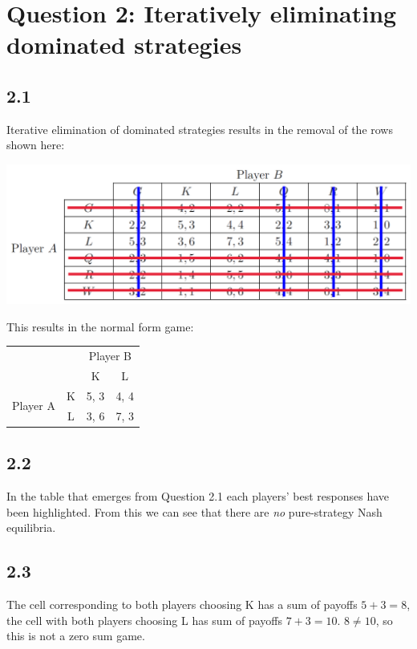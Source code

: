 \documentclass{article}
\begin{document}
\section*{Question 2: Iteratively eliminating dominated strategies}
\subsection*{2.1} Iterative elimination of dominated strategies results in the removal of the rows shown here:
\begin{center}
    \includegraphics[width=0.7\linewidth]{iterative-elimination.png}
\end{center}
This results in the normal form game:
\begin{table}[h!]
    \centering
    \begin{tabular}{cccc}
                                                   &                        & \multicolumn{2}{c}{Player B}                          \\ \cline{3-4} 
                                                   & \multicolumn{1}{c|}{}  & \multicolumn{1}{c|}{K}    & \multicolumn{1}{c|}{L}    \\ \cline{2-4} 
    \multicolumn{1}{c|}{\multirow{2}{*}{Player A}} & \multicolumn{1}{c|}{K} & \multicolumn{1}{c|}{{\color{red}5}, 3} & \multicolumn{1}{c|}{4, {\color{blue}4}} \\ \cline{2-4} 
    \multicolumn{1}{c|}{}                          & \multicolumn{1}{c|}{L} & \multicolumn{1}{c|}{3, {\color{blue}6}} & \multicolumn{1}{c|}{{\color{red}7}, 3} \\ \cline{2-4} 
    \end{tabular}
\end{table}

\subsection*{2.2}
In the table that emerges from Question 2.1 each players' best responses have been highlighted. From this we can see that there are \textit{no} pure-strategy Nash equilibria.

\subsection*{2.3}
The cell corresponding to both players choosing K has a sum of payoffs $5+3 = 8$, the cell with both players choosing L has sum of payoffs $7+3 = 10$. $8 \neq 10$, so this is not a zero sum game.
\end{document}
